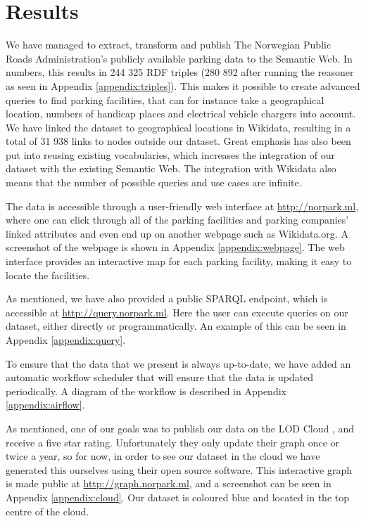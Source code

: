 \chapter{Results}
We have managed to extract, transform and publish The Norwegian Public Roads Administration's publicly available parking data to the Semantic Web. In numbers, this results in 244 325 RDF triples (280 892 after running the reasoner as seen in Appendix \ref{appendix:triples}). This makes it possible to create advanced queries to find parking facilities, that can for instance take a geographical location, numbers of handicap places and electrical vehicle chargers into account. We have linked the dataset to geographical locations in Wikidata, resulting in a total of 31 938 links to nodes outside our dataset. Great emphasis has also been put into reusing existing vocabularies, which increases the integration of our dataset with the existing Semantic Web. The integration with Wikidata also means that the number of possible queries and use cases are infinite.

\vspace{5mm}
The data is accessible through a user-friendly web interface at \url{http://norpark.ml}, where one can click through all of the parking facilities and parking companies' linked attributes and even end up on another webpage such as Wikidata.org. A screenshot of the webpage is shown in Appendix \ref{appendix:webpage}. The web interface provides an interactive map for each parking facility, making it easy to locate the facilities.

\vspace{5mm}

As mentioned, we have also provided a public SPARQL endpoint, which is accessible at \url{http://query.norpark.ml}. Here the user can execute queries on our dataset, either directly or programmatically. An example of this can be seen in Appendix \ref{appendix:query}.

\vspace{5mm}

To ensure that the data that we present is always up-to-date, we have added an automatic workflow scheduler that will ensure that the data is updated periodically. A diagram of the workflow is described in Appendix \ref{appendix:airflow}.

\vspace{5mm}

As mentioned, one of our goals was to publish our data on the LOD Cloud \cite{lod-cloud}, and receive a five star rating. Unfortunately they only update their graph once or twice a year, so for now, in order to see our dataset in the cloud we have generated this ourselves using their open source software. This interactive graph is made public at \url{http://graph.norpark.ml}, and a screenshot can be seen in Appendix \ref{appendix:cloud}. Our dataset is coloured blue and located in the top centre of the cloud.

